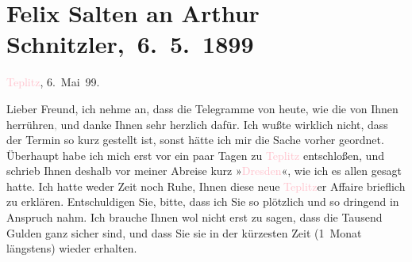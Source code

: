 

\renewcommand{\erwaehnteInstitutionen}{Institutionen: Stadttheater Teplitz}
\renewcommand{\erwaehnteOrte}{Orte: Dresden, Teplice, Wien}
\renewcommand{\erwaehnteWerke}{}
\section[ Felix Salten an Arthur Schnitzler, 6. 5. 1899]{Felix Salten an Arthur Schnitzler, 6. 5. 1899}
\nopagebreak{}
\rehead{ }\normalsize\beginnumbering{}
\toendnotes[C]{\smallbreak\pagebreak[2]}
\toendnotes[C]{\smallbreak}
\pstart
           \raggedleft{}{\pb}\textcolor{pink}{Teplitz}{}\ledrightnote{\textcolor{pink}{Teplice}}, 6. Mai 99.\pend
           
\pstart
           Lieber Freund, ich nehme an, dass die Telegramme von heute, wie die \label{K_L03291-1v}\label{K_L03291-1h} von Ihnen herrühren\textcolor{gray}{,}
               und danke Ihnen sehr herzlich dafür. Ich wußte wirklich nicht, dass der Termin so
               kurz gestellt ist, sonst hätte ich mir die Sache vorher geordnet. Überhaupt habe ich
               mich erst vor ein paar Tagen zu \textcolor{pink}{Teplitz}{}\ledrightnote{\textcolor{pink}{Teplice}}
               entschloßen, und schrieb Ihnen deshalb vor meiner Abreise kurz »\textcolor{pink}{Dresden}{}\ledrightnote{\textcolor{pink}{Dresden}}«, wie ich es allen gesagt hatte. Ich hatte {\pb}weder Zeit noch Ruhe, Ihnen
               diese neue \textcolor{pink}{Teplitz}{}\ledrightnote{\textcolor{pink}{Teplice}}er Affaire brieflich zu
               erklären. Entschuldigen Sie, bitte, dass ich Sie so plötzlich und so dringend in
               Anspruch nahm. Ich brauche Ihnen wol nicht erst zu sagen, dass die Tausend Gulden
               ganz sicher sind, und dass Sie sie in der kürzesten Zeit (1 Monat längstens) wieder
               erhalten.\pend
           
